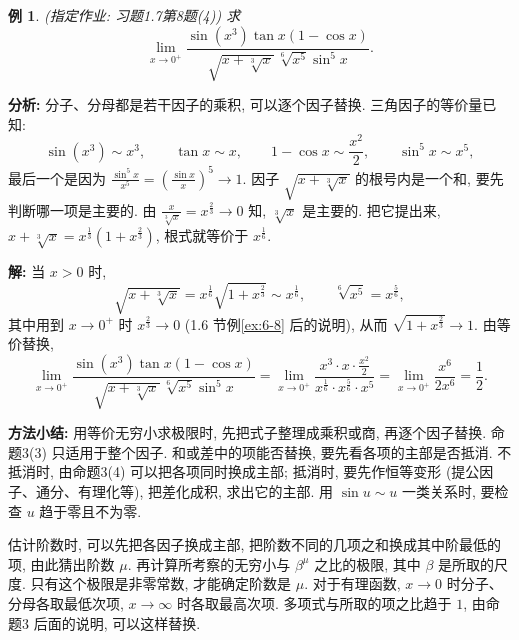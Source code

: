 \documentclass[UTF8,openany]{ctexbook}
\theoremstyle{chinesetextbook}
\newtheorem{example}{例}[section]
\newenvironment{cnsolution}{\par\indent\textbf{解:} \ignorespaces}{\par}
\begin{document}
\begin{example}
\textnormal{(指定作业: 习题1.7第8题(4))} 求
\[
\lim_{x\to0^+}\frac{\sin(x^3)\tan x(1-\cos x)}{\sqrt{x+\sqrt[3]x}\,\sqrt[6]{x^5}\sin^5x}.
\]
\end{example}
\par\indent\textbf{分析:} 分子、分母都是若干因子的乘积, 可以逐个因子替换. 三角因子的等价量已知:
\[
\sin(x^3)\sim x^3,\qquad\tan x\sim x,\qquad1-\cos x\sim\frac{x^2}2,\qquad\sin^5x\sim x^5,
\]
最后一个是因为 $\displaystyle\frac{\sin^5x}{x^5}=\left(\frac{\sin x}x\right)^5\to1$. 因子 $\sqrt{x+\sqrt[3]x}$ 的根号内是一个和, 要先判断哪一项是主要的. 由 $\displaystyle\frac x{\sqrt[3]x}=x^{\frac23}\to0$ 知, $\sqrt[3]x$ 是主要的. 把它提出来, $x+\sqrt[3]x=x^{\frac13}\left(1+x^{\frac23}\right)$, 根式就等价于 $x^{\frac16}$.
\begin{cnsolution}
当 $x>0$ 时,
\[
\sqrt{x+\sqrt[3]x}=x^{\frac16}\sqrt{1+x^{\frac23}}\sim x^{\frac16},\qquad\sqrt[6]{x^5}=x^{\frac56},
\]
其中用到 $x\to0^+$ 时 $x^{\frac23}\to0$ (1.6 节例\ref{ex:6-8} 后的说明), 从而 $\sqrt{1+x^{\frac23}}\to1$. 由等价替换,
\[
\lim_{x\to0^+}\frac{\sin(x^3)\tan x(1-\cos x)}{\sqrt{x+\sqrt[3]x}\,\sqrt[6]{x^5}\sin^5x}=\lim_{x\to0^+}\frac{x^3\cdot x\cdot\frac{x^2}2}{x^{\frac16}\cdot x^{\frac56}\cdot x^5}=\lim_{x\to0^+}\frac{x^6}{2x^6}=\frac12.
\]
\end{cnsolution}
\par\indent\textbf{方法小结:} 用等价无穷小求极限时, 先把式子整理成乘积或商, 再逐个因子替换. 命题3(3) 只适用于整个因子. 和或差中的项能否替换, 要先看各项的主部是否抵消. 不抵消时, 由命题3(4) 可以把各项同时换成主部; 抵消时, 要先作恒等变形 (提公因子、通分、有理化等), 把差化成积, 求出它的主部. 用 $\sin u\sim u$ 一类关系时, 要检查 $u$ 趋于零且不为零.

估计阶数时, 可以先把各因子换成主部, 把阶数不同的几项之和换成其中阶最低的项, 由此猜出阶数 $\mu$. 再计算所考察的无穷小与 $\beta^\mu$ 之比的极限, 其中 $\beta$ 是所取的尺度. 只有这个极限是非零常数, 才能确定阶数是 $\mu$. 对于有理函数, $x\to0$ 时分子、分母各取最低次项, $x\to\infty$ 时各取最高次项. 多项式与所取的项之比趋于 $1$, 由命题3 后面的说明, 可以这样替换.
\end{document}

